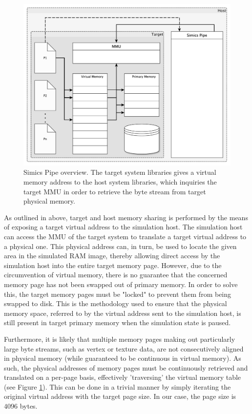 \begin{figure}
\centering
\includegraphics[width=\linewidth]{img/yedvirtualmemory.pdf}
\caption{Simics Pipe overview. The target system libraries gives a virtual memory address to the host system libraries, which inquiries the target MMU in order to retrieve the byte stream from target physical memory.}
\label{fig:virtualmemory}
\end{figure}

As outlined in above, target and host memory sharing is performed by the means of exposing a target virtual address to the simulation host.
The simulation host can access the MMU of the target system to translate a target virtual address to a physical one.
This physical address can, in turn, be used to locate the given area in the simulated RAM image, thereby allowing direct access by the simulation host into the entire target memory page.
However, due to the circumvention of virtual memory, there is no guarantee that the concerned memory page has not been swapped out of primary memory.
In order to solve this, the target memory pages must be "locked" to prevent them from being swapped to disk.
This is the methodology used to ensure that the physical memory space, referred to by the virtual address sent to the simulation host, is still present in target primary memory when the simulation state is paused.

Furthermore, it is likely that multiple memory pages making out particularly large byte streams, such as vertex or texture data, are not consecutively aligned in physical memory (while guaranteed to be continuous in virtual memory).
As such, the physical addresses of memory pages must be continuously retrieved and translated on a per-page basis, effectively 'traversing' the virtual memory table (see Figure \ref{fig:virtualmemory}).
This can be done in a trivial manner by simply iterating the original virtual address with the target page size.
In our case, the page size is $4096$ bytes.

